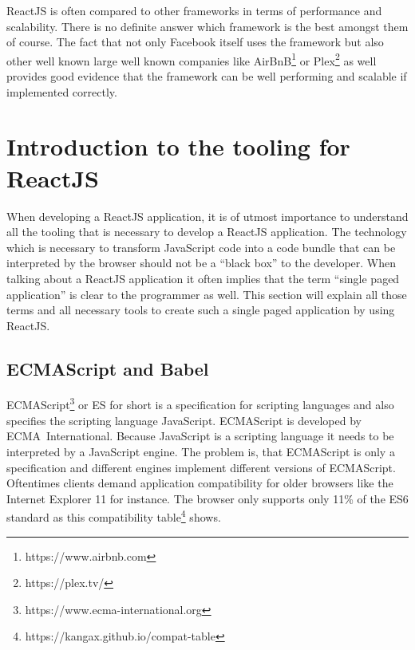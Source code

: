 ReactJS is often compared to other frameworks in terms of performance and scalability. There is no definite answer which framework is the best amongst them of course. The fact that not only Facebook itself uses the framework but also other well known large well known companies like AirBnB\footnote{https://www.airbnb.com} or Plex\footnote{https://plex.tv/} as well provides good evidence that the framework can be well performing and scalable if implemented correctly.


\section{Introduction to the tooling for ReactJS}

When developing a \mbox{ReactJS} application, it is of utmost importance to understand all the tooling that is necessary to develop a ReactJS application. The technology which is necessary to transform \mbox{JavaScript} code into a code bundle that can be interpreted by the browser should not be a \enquote{black box} to the developer. When talking about a \mbox{ReactJS} application it often implies that the term \enquote{single paged application} is clear to the programmer as well. This section will explain all those terms and all necessary tools to create such a single paged application by using ReactJS.


\subsection{ECMAScript and Babel}


\mbox{ECMAScript}\footnote{https://www.ecma-international.org} or ES for short is a specification for scripting languages and also specifies the scripting language \mbox{JavaScript}. \mbox{ECMAScript} is developed by \mbox{ECMA International}. Because \mbox{JavaScript} is a scripting language it needs to be interpreted by a JavaScript engine. The problem is, that ECMAScript is only a specification and different engines implement different versions of ECMAScript. Oftentimes clients demand application compatibility for older browsers like the Internet Explorer 11 for instance. The browser only supports only 11\% of the ES6 standard as this compatibility table\footnote{https://kangax.github.io/compat-table} shows. 

